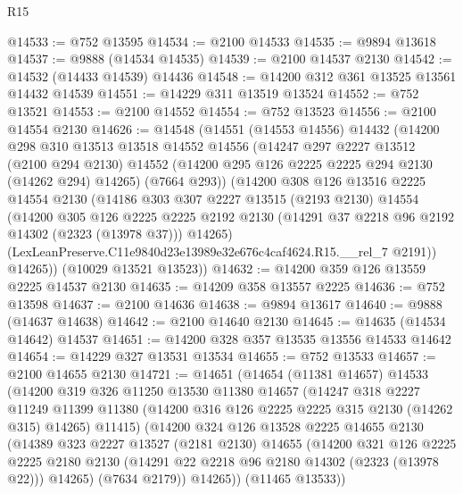 \begin{lexlean}{R15}
\begin{coremodule}
@14533 := @752 @13595
@14534 := @2100 @14533
@14535 := @9894 @13618
@14537 := @9888 (@14534 @14535)
@14539 := @2100 @14537 @2130
@14542 := @14532 (@14433 @14539) @14436
@14548 := @14200 @312 @361 @13525 @13561 @14432 @14539
@14551 := @14229 @311 @13519 @13524
@14552 := @752 @13521
@14553 := @2100 @14552
@14554 := @752 @13523
@14556 := @2100 @14554 @2130
@14626 := @14548
    (@14551
      (@14553 @14556)
      @14432
      (@14200
        @298
        @310
        @13513
        @13518
        @14552
        @14556
        (@14247
          @297
          @2227
          @13512
          (@2100 @294 @2130)
          @14552
          (@14200 @295 @126 @2225 @2225 @294 @2130 (@14262 @294) @14265)
          (@7664 @293))
        (@14200
          @308
          @126
          @13516
          @2225
          @14554
          @2130
          (@14186
            @303
            @307
            @2227
            @13515
            (@2193 @2130)
            @14554
            (@14200
              @305
              @126
              @2225
              @2225
              @2192
              @2130
              (@14291 @37 @2218 @96 @2192 @14302 (@2323 (@13978 @37)))
              @14265)
            (LexLeanPreserve.C11e9840d23e13989e32e676c4caf4624.R15.__rel_7 @2191))
          @14265))
      (@10029 @13521 @13523))
@14632 := @14200 @359 @126 @13559 @2225 @14537 @2130
@14635 := @14209 @358 @13557 @2225
@14636 := @752 @13598
@14637 := @2100 @14636
@14638 := @9894 @13617
@14640 := @9888 (@14637 @14638)
@14642 := @2100 @14640 @2130
@14645 := @14635 (@14534 @14642) @14537
@14651 := @14200 @328 @357 @13535 @13556 @14533 @14642
@14654 := @14229 @327 @13531 @13534
@14655 := @752 @13533
@14657 := @2100 @14655 @2130
@14721 := @14651
    (@14654
      (@11381 @14657)
      @14533
      (@14200
        @319
        @326
        @11250
        @13530
        @11380
        @14657
        (@14247
          @318
          @2227
          @11249
          @11399
          @11380
          (@14200 @316 @126 @2225 @2225 @315 @2130 (@14262 @315) @14265)
          @11415)
        (@14200
          @324
          @126
          @13528
          @2225
          @14655
          @2130
          (@14389
            @323
            @2227
            @13527
            (@2181 @2130)
            @14655
            (@14200
              @321
              @126
              @2225
              @2225
              @2180
              @2130
              (@14291 @22 @2218 @96 @2180 @14302 (@2323 (@13978 @22)))
              @14265)
            (@7634 @2179))
          @14265))
      (@11465 @13533))

\end{coremodule}
\end{lexlean}
